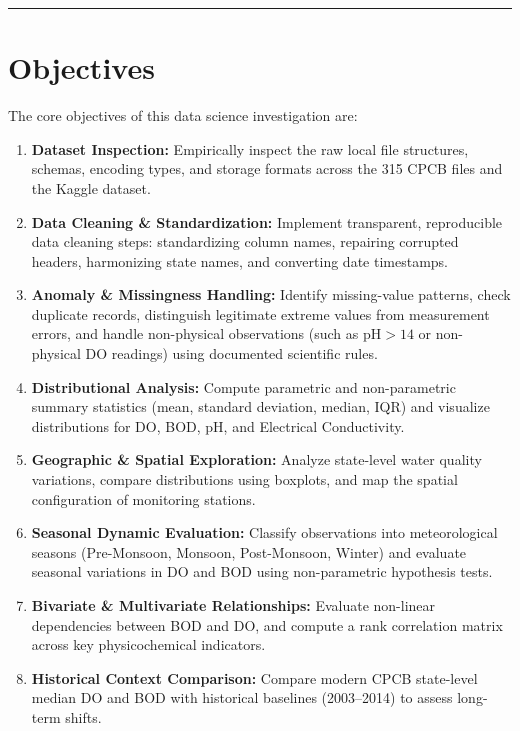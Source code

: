 \documentclass[
]{article}
\providecommand{\tightlist}{%
  \setlength{\itemsep}{0pt}\setlength{\parskip}{0pt}}
\begin{document}
\begin{center}\rule{0.5\linewidth}{0.5pt}\end{center}

\section{Objectives}\label{objectives}

The core objectives of this data science investigation are:

\begin{enumerate}
\def\labelenumi{\arabic{enumi}.}
\tightlist
\item
  \textbf{Dataset Inspection:} Empirically inspect the raw local file
  structures, schemas, encoding types, and storage formats across the
  315 CPCB files and the Kaggle dataset.
\item
  \textbf{Data Cleaning \& Standardization:} Implement transparent,
  reproducible data cleaning steps: standardizing column names,
  repairing corrupted headers, harmonizing state names, and converting
  date timestamps.
\item
  \textbf{Anomaly \& Missingness Handling:} Identify missing-value
  patterns, check duplicate records, distinguish legitimate extreme
  values from measurement errors, and handle non-physical observations
  (such as \(\text{pH} > 14\) or non-physical DO readings) using
  documented scientific rules.
\item
  \textbf{Distributional Analysis:} Compute parametric and
  non-parametric summary statistics (mean, standard deviation, median,
  IQR) and visualize distributions for DO, BOD, pH, and Electrical
  Conductivity.
\item
  \textbf{Geographic \& Spatial Exploration:} Analyze state-level water
  quality variations, compare distributions using boxplots, and map the
  spatial configuration of monitoring stations.
\item
  \textbf{Seasonal Dynamic Evaluation:} Classify observations into
  meteorological seasons (Pre-Monsoon, Monsoon, Post-Monsoon, Winter)
  and evaluate seasonal variations in DO and BOD using non-parametric
  hypothesis tests.
\item
  \textbf{Bivariate \& Multivariate Relationships:} Evaluate non-linear
  dependencies between BOD and DO, and compute a rank correlation matrix
  across key physicochemical indicators.
\item
  \textbf{Historical Context Comparison:} Compare modern CPCB
  state-level median DO and BOD with historical baselines (2003--2014)
  to assess long-term shifts.
\end{enumerate}
\end{document}
